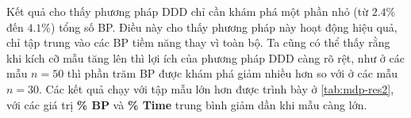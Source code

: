 \documentclass[../main.tex]{subfiles}
\begin{document}
Kết quả cho thấy phương pháp DDD chỉ cần khám phá một phần nhỏ (từ
\(2.4\%\) đến \(4.1\%\)) tổng số BP. Điều này cho thấy phương pháp này
hoạt động hiệu quả, chỉ tập trung vào các BP tiềm năng thay vì toàn bộ.
Ta cũng có thể thấy rằng khi kích cỡ mẫu tăng lên thì
lợi ích của phương pháp DDD càng rõ rệt, như ở các mẫu \(n=50\) thì phần trăm BP được khám phá
giảm nhiều hơn so với ở các mẫu \(n=30\). Các kết quả chạy với tập mẫu lớn hơn được
trình bày ở \autoref{tab:mdp-res2}, với các giá trị \textbf{\% BP} và \textbf{\% Time} trung bình giảm dần khi mẫu
càng lớn.


\end{document}
